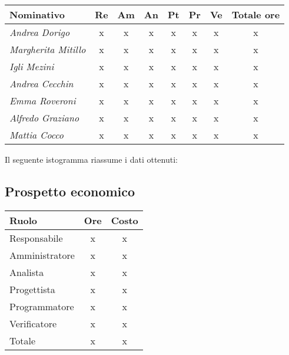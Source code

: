 {{{{{	\begin{center}
		\renewcommand{\arraystretch}{1.4}
		\begin{tabularx}{\textwidth}{|X|c|c|c|c|c|c|c|}
			\hline
			\rowcolor{airforceblue}
			\textbf{Nominativo} & \textbf{Re} & \textbf{Am} & \textbf{An} & \textbf{Pt} & \textbf{Pr} & \textbf{Ve} & \textbf{Totale ore}\\
			\hline
			\textit{Andrea Dorigo} & x & x & x & x & x & x & x\\
			\hline
			\textit{Margherita Mitillo} & x & x & x & x & x & x & x\\
			\hline
			\textit{Igli Mezini} & x & x & x & x & x & x & x\\
			\hline
			\textit{Andrea Cecchin} & x & x & x & x & x & x & x\\
			\hline
			\textit{Emma Roveroni} & x & x & x & x & x & x & x\\
			\hline
			\textit{Alfredo Graziano} & x & x & x & x & x & x & x\\
			\hline
			\textit{Mattia Cocco} & x & x & x & x & x & x & x\\
			\hline
		\end{tabularx}
	\end{center}

Il seguente istogramma riassume i dati ottenuti:

\subsection{Prospetto economico}\label{5.3.2}
\quad
\def\tabularxcolumn#1{m{#1}}
{	
	\begin{center}
		\renewcommand{\arraystretch}{1.4}
		\begin{tabularx}{7cm}{|X|c|c|}
			\hline
			\rowcolor{airforceblue}
			\textbf{Ruolo} & \textbf{Ore} & \textbf{Costo}\\
			\hline
			Responsabile & x & x\\
			\hline
			Amministratore & x & x\\
			\hline
			Analista & x & x\\
			\hline
			Progettista & x & x\\
			\hline
			Programmatore & x & x\\
			\hline
			Verificatore & x & x\\
			\hline
			Totale & x & x\\
			\hline
		\end{tabularx}
	\end{center}

}}}}}}
